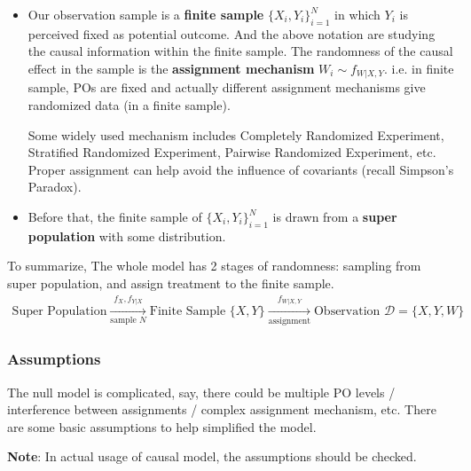 \begin{itemize}[topsep=2pt,itemsep=0pt]
    \item Our observation sample is a \textbf{finite sample} $\{X_i,Y_i\}_{i=1}^N $ in which $ Y_i $ is perceived fixed as potential outcome. And the above notation are studying the causal information within the finite sample. The randomness of the causal effect in the sample is the \textbf{assignment mechanism} $ W_i\sim f_{W|X,Y} $. i.e. in finite sample, POs are fixed and actually different assignment mechanisms give randomized data (in a finite sample).
    
    Some widely used mechanism includes Completely Randomized Experiment, Stratified Randomized Experiment, Pairwise Randomized Experiment, etc. Proper assignment can help avoid the influence of covariants (recall Simpson's Paradox).
    \item Before that, the finite sample of $ \{X_i,Y_i\}_{i=1}^N $ is drawn from a \textbf{super population} with some distribution.
\end{itemize}

    To summarize, The whole model has 2 stages of randomness: sampling from super population, and assign treatment to the finite sample.
\begin{align*}
    \text{Super Population}\xrightarrow[\text{sample }N]{f_{X}, f_{Y|X}}\text{Finite Sample }\{X,Y\}\xrightarrow[\text{assignment}]{f_{W|X,Y}}\text{Observation }\mathcal{D}=\{X,Y,W\}
\end{align*}


\subsubsection{Assumptions}

The null model is complicated, say, there could be multiple PO levels / interference between assignments / complex assignment mechanism, etc. There are some basic assumptions to help simplified the model.

\textbf{Note}: In actual usage of causal model, the assumptions should be checked.  

